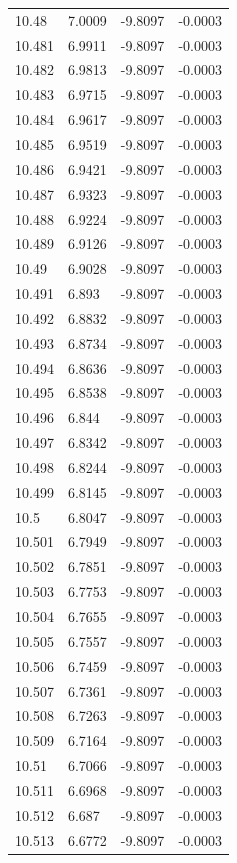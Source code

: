 \begin{tabular}{llll}
10.48 & 7.0009 & -9.8097 & -0.0003 \\
10.481 & 6.9911 & -9.8097 & -0.0003 \\
10.482 & 6.9813 & -9.8097 & -0.0003 \\
10.483 & 6.9715 & -9.8097 & -0.0003 \\
10.484 & 6.9617 & -9.8097 & -0.0003 \\
10.485 & 6.9519 & -9.8097 & -0.0003 \\
10.486 & 6.9421 & -9.8097 & -0.0003 \\
10.487 & 6.9323 & -9.8097 & -0.0003 \\
10.488 & 6.9224 & -9.8097 & -0.0003 \\
10.489 & 6.9126 & -9.8097 & -0.0003 \\
10.49 & 6.9028 & -9.8097 & -0.0003 \\
10.491 & 6.893 & -9.8097 & -0.0003 \\
10.492 & 6.8832 & -9.8097 & -0.0003 \\
10.493 & 6.8734 & -9.8097 & -0.0003 \\
10.494 & 6.8636 & -9.8097 & -0.0003 \\
10.495 & 6.8538 & -9.8097 & -0.0003 \\
10.496 & 6.844 & -9.8097 & -0.0003 \\
10.497 & 6.8342 & -9.8097 & -0.0003 \\
10.498 & 6.8244 & -9.8097 & -0.0003 \\
10.499 & 6.8145 & -9.8097 & -0.0003 \\
10.5 & 6.8047 & -9.8097 & -0.0003 \\
10.501 & 6.7949 & -9.8097 & -0.0003 \\
10.502 & 6.7851 & -9.8097 & -0.0003 \\
10.503 & 6.7753 & -9.8097 & -0.0003 \\
10.504 & 6.7655 & -9.8097 & -0.0003 \\
10.505 & 6.7557 & -9.8097 & -0.0003 \\
10.506 & 6.7459 & -9.8097 & -0.0003 \\
10.507 & 6.7361 & -9.8097 & -0.0003 \\
10.508 & 6.7263 & -9.8097 & -0.0003 \\
10.509 & 6.7164 & -9.8097 & -0.0003 \\
10.51 & 6.7066 & -9.8097 & -0.0003 \\
10.511 & 6.6968 & -9.8097 & -0.0003 \\
10.512 & 6.687 & -9.8097 & -0.0003 \\
10.513 & 6.6772 & -9.8097 & -0.0003 \\

\end{tabular}
